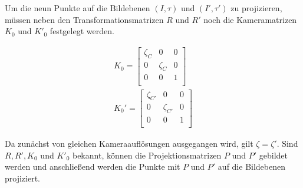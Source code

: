 
%


Um die neun Punkte auf die Bildebenen $(I,\tau)$ und $(I',\tau')$ zu projizieren, müssen neben den Transformationsmatrizen $R$ und $R'$ noch die Kameramatrizen $K_0$ und $K'_0$ festgelegt werden.


\begin{gather}		
K_0 =
\begin{bmatrix}
\zeta_{C}&0&0\\
0&\zeta_{C}&0\\
0&0&1\\
\end{bmatrix}\label{eq:eq4.9}\\
K_0' =
\begin{bmatrix}
\zeta_{C'}&0&0\\
0&\zeta_{C'}&0\\
0&0&1\\
\end{bmatrix}\label{eq:eq4.10}
\end{gather}

Da zunächst von gleichen Kameraauflösungen ausgegangen wird, gilt $\zeta = \zeta'$. Sind $R,R',K_0$ und $K'_0$ bekannt, können die Projektionsmatrizen $P$ und $P'$ gebildet werden und anschließend werden die Punkte mit $P$ und $P'$ auf die Bildebenen projiziert.


